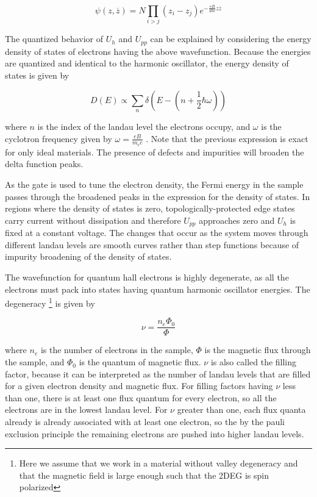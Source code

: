 \documentclass[12pt]{article}
\theoremstyle{definition}
\theoremstyle{remark}
\begin{document}
\begin{equation}
\psi(z,\overline{z}) = N \prod_{i > j} (z_{i} - z_{j}) e^{-\frac{eB}{4 \hbar c} z \overline{z}}
\end{equation}

The quantized behavior of $U_{h}$ and $U_{pp}$ can be explained by considering the energy density of states of electrons having the above wavefunction. Because the energies are quantized and identical to the harmonic oscillator, the energy density of states is given by

\begin{equation}
D(E) \propto \sum_{n} \delta \left(E - \left(n + \frac{1}{2} \hbar \omega \right) \right)
\end{equation}

where $n$ is the index of the landau level the electrons occupy, and $\omega$ is the cyclotron frequency given by $\omega = \frac{eB}{m_{e} c}$ \cite{chak:qhe}. Note that the previous expression is exact for only ideal materials. The presence of defects and impurities will broaden the delta function peaks.

As the gate is used to tune the electron density, the Fermi energy in the sample passes through the broadened peaks in the expression for the density of states. In regions where the density of states is zero, topologically-protected edge states carry current without dissipation and therefore $U_{pp}$ approaches zero and $U_{h}$ is fixed at a constant voltage. The changes that occur as the system moves through different landau levels are smooth curves rather than step functions because of impurity broadening of the density of states.

The wavefunction for quantum hall electrons is highly degenerate, as all the electrons must pack into states having quantum harmonic oscillator energies. The degeneracy \footnote{Here we assume that we work in a material without valley degeneracy and that the magnetic field is large enough such that the 2DEG is spin polarized} is given by \cite{chak:qhe}

\begin{equation}
\nu = \frac{n_{e}\Phi_{0}}{\Phi}
\end{equation}

where $n_{e}$ is the number of electrons in the sample, $\Phi$ is the magnetic flux through the sample, and $\Phi_{0}$ is the quantum of magnetic flux. $\nu$ is also called the filling factor, because it can be interpreted as the number of landau levels that are filled for a given electron density and magnetic flux. For filling factors having $\nu$ less than one, there is at least one flux quantum for every electron, so all the electrons are in the lowest landau level. For $\nu$ greater than one, each flux quanta already is already associated with at least one electron, so the by the pauli exclusion principle the remaining electrons are pushed into higher landau levels.
\end{document}
